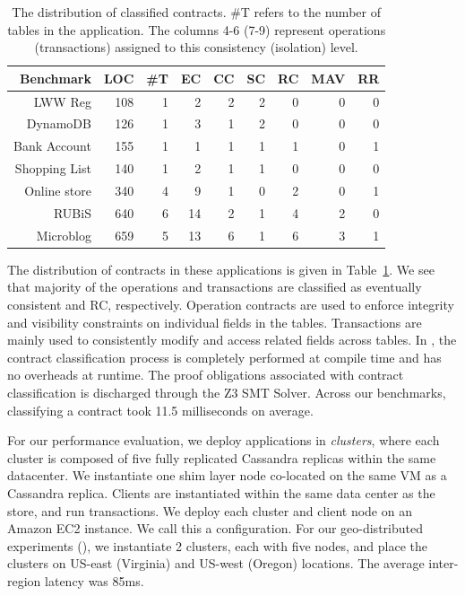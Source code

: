 \begin{table}
\setlength{\tabcolsep}{4pt}
\renewcommand{\arraystretch}{1.2}
{\sffamily
\begin{center}
\caption{The distribution of classified contracts. \#T refers to the number of
tables in the application. The columns 4-6 (7-9) represent operations
(transactions) assigned to this consistency (isolation) level.}
\label{tab:ctrts}
\begin{tabular} {rrrrrrrrr}
\hline
{\bf Benchmark} & {\bf LOC} & {\bf \#T} & {\bf EC} & {\bf CC} & {\bf SC} & {\bf RC} & {\bf MAV} & {\bf RR} \\
\hline
{LWW Reg} & 108 & 1 & 2 & 2 & 2 & 0 & 0 & 0 \\
{DynamoDB} & 126 & 1 & 3 & 1 & 2 & 0 & 0 & 0 \\
{Bank Account} & 155 & 1 & 1 & 1 & 1 & 1 & 0 & 1 \\
{Shopping List} & 140 & 1 & 2 & 1 & 1 & 0 & 0 & 0 \\
{Online store} & 340 & 4 & 9 & 1 & 0 & 2 & 0 & 1 \\
{RUBiS} & 640 & 6 & 14 & 2 & 1 & 4 & 2 & 0 \\
{Microblog} & 659 & 5 & 13 & 6 & 1 & 6 & 3 & 1 \\
\hline
\end{tabular}
\end{center} }
\end{table}

The distribution of contracts in these applications is given in
Table~\ref{tab:ctrts}. We see that majority of the operations and transactions
are classified as eventually consistent and RC, respectively. Operation
contracts are used to enforce integrity and visibility constraints on
individual fields in the tables. Transactions are mainly used to consistently
modify and access related fields across tables. In \name, the contract
classification process is completely performed at compile time and has no
overheads at runtime. The proof obligations associated with contract
classification is discharged through the Z3 SMT Solver. Across our benchmarks,
classifying a contract took 11.5 milliseconds on average.

For our performance evaluation, we deploy \name applications in
\emph{clusters}, where each cluster is composed of five fully replicated
Cassandra replicas within the same datacenter. We instantiate one shim layer
node co-located on the same VM as a Cassandra replica. Clients are instantiated
within the same data center as the store, and run transactions. We deploy each
cluster and client node on an  Amazon EC2 instance. We call this
a  configuration. For our geo-distributed experiments (), we
instantiate 2 clusters, each with five nodes, and place the clusters on US-east
(Virginia) and US-west (Oregon) locations. The average inter-region latency was
85ms.

